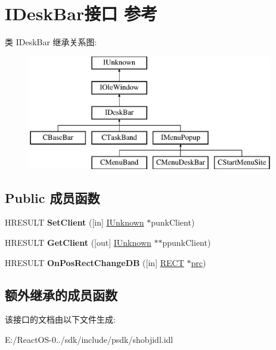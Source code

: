 \hypertarget{interface_i_desk_bar}{}\section{I\+Desk\+Bar接口 参考}
\label{interface_i_desk_bar}
类 I\+Desk\+Bar 继承关系图\+:\begin{figure}[H]
\begin{center}
\leavevmode
\includegraphics[height=5.000000cm]{interface_i_desk_bar}
\end{center}
\end{figure}
\subsection*{Public 成员函数}
\begin{DoxyCompactItemize}
\item 
\mbox{\label{interface_i_desk_bar_aec4693d0893536dc15a64dc9b0dec183}} 
H\+R\+E\+S\+U\+LT {\bfseries Set\+Client} (\mbox{[}in\mbox{]} \hyperlink{interface_i_unknown}{I\+Unknown} $\ast$punk\+Client)
\item 
\mbox{\label{interface_i_desk_bar_a605e9a94c733baef3772a33297327603}} 
H\+R\+E\+S\+U\+LT {\bfseries Get\+Client} (\mbox{[}out\mbox{]} \hyperlink{interface_i_unknown}{I\+Unknown} $\ast$$\ast$ppunk\+Client)
\item 
\mbox{\label{interface_i_desk_bar_a9dce783339f8dd59c0ac283b440b25de}} 
H\+R\+E\+S\+U\+LT {\bfseries On\+Pos\+Rect\+Change\+DB} (\mbox{[}in\mbox{]} \hyperlink{structtag_r_e_c_t}{R\+E\+CT} $\ast$\hyperlink{structtag_r_e_c_t}{prc})
\end{DoxyCompactItemize}
\subsection*{额外继承的成员函数}


该接口的文档由以下文件生成\+:\begin{DoxyCompactItemize}
\item 
E\+:/\+React\+O\+S-\/0../sdk/include/psdk/shobjidl.\+idl\end{DoxyCompactItemize}
